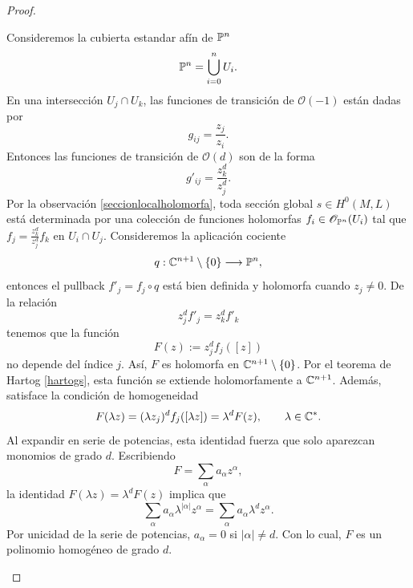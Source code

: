 \begin{proof}
\begin{enumerate}
			Consideremos la cubierta estandar afín de $\mathbb{P}^n$
			\begin{equation*}
				\mathbb{P}^n=\bigcup_{i=0}^n U_i.
			\end{equation*}
			En una intersección $U_j\cap U_k$, las funciones de transición de $\mathcal{O}(-1)$ están dadas por 
			\begin{equation*}
				g_{ij}=\frac{z_j}{z_i}.
			\end{equation*}
			Entonces las funciones de transición de $\mathcal{O}(d)$ son de la forma
			\begin{equation*}
				g'_{ij}=\frac{z_k^d}{z_j^d}.
			\end{equation*}
			Por la observación \ref{seccionlocalholomorfa}, toda sección global $s\in H^0(M,L)$ está determinada por una colección de funciones holomorfas $f_i\in\mathscr{O}_{\mathbb{P}^n}(U_i)$ tal que $f_j=\frac{z_k^d}{z_j^d}f_k$ en $U_i\cap U_j$. Consideremos la aplicación cociente
			\begin{align*}
				q:\mathbb{C}^{n+1}\setminus\{0\}\longrightarrow \mathbb{P}^n,
			\end{align*}
			entonces el pullback $f'_j=f_j\circ q$ está bien definida y holomorfa cuando $z_j\neq 0$. De la relación
			\begin{equation*}
				z_j^df'_j=z_k^d f'_k
			\end{equation*}
			tenemos que la función
			\begin{equation*}
				F(z):=z_j^df_j([z])
			\end{equation*}
			no depende del índice $j$. Así, $F$ es holomorfa en $\mathbb{C}^{n+1}\setminus\{0\}$. Por el teorema de Hartog \ref{hartogs}, esta función se extiende holomorfamente a $\mathbb{C}^{n+1}$. Además, satisface la condición de homogeneidad 
			\begin{equation*}
				F(\lambda z)=(\lambda z_j)^d f_j([\lambda z])=\lambda^d F(z),\qquad \lambda\in\mathbb{C}^*.
			\end{equation*}
			Al expandir en serie de potencias, esta identidad fuerza que solo aparezcan monomios de grado $d$. 
			Escribiendo
			\begin{equation*}
				F=\sum_\alpha a_\alpha z^\alpha,
			\end{equation*}
			la identidad $ F(\lambda z)=\lambda^dF(z)$ implica que
			\begin{equation*}
				\sum_\alpha a_\alpha \lambda^{|\alpha|}z^\alpha
				=
				\sum_\alpha a_\alpha \lambda^d z^\alpha.
			\end{equation*}
			Por unicidad de la serie de potencias,
			$a_\alpha=0$ si $|\alpha|\neq d$. Con lo cual, $F$ es un polinomio homogéneo de grado $d$.
			

\end{enumerate}
\end{proof}
